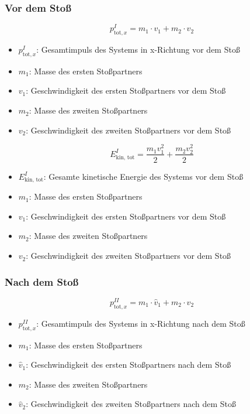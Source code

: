 \documentclass[a4paper, 8pt]{extarticle}
\begin{document}
\begin{landscape}
\begin{multicols*}{3}
\subsubsection{Vor dem Stoß}
\[
p_{\text{tot},x}^I = m_1 \cdot v_1 + m_2 \cdot v_2
\]
{\footnotesize
\begin{itemize}
    \item \( p_{\text{tot},x}^I \): Gesamtimpuls des Systems in x-Richtung vor dem Stoß
    \item \( m_1 \): Masse des ersten Stoßpartners
    \item \( v_1 \): Geschwindigkeit des ersten Stoßpartners vor dem Stoß
    \item \( m_2 \): Masse des zweiten Stoßpartners
    \item \( v_2 \): Geschwindigkeit des zweiten Stoßpartners vor dem Stoß
\end{itemize}
}

\[
E_{\text{kin, tot}}^I = \frac{m_1 v_1^2}{2} + \frac{m_2 v_2^2}{2}
\]
{\footnotesize
\begin{itemize}
    \item \( E_{\text{kin, tot}}^I \): Gesamte kinetische Energie des Systems vor dem Stoß
    \item \( m_1 \): Masse des ersten Stoßpartners
    \item \( v_1 \): Geschwindigkeit des ersten Stoßpartners vor dem Stoß
    \item \( m_2 \): Masse des zweiten Stoßpartners
    \item \( v_2 \): Geschwindigkeit des zweiten Stoßpartners vor dem Stoß
\end{itemize}
}

\subsubsection{Nach dem Stoß}
\[
p_{\text{tot},x}^{II} = m_1 \cdot \hat{v}_1 + m_2 \cdot \hat{v}_2
\]
{\footnotesize
\begin{itemize}
    \item \( p_{\text{tot},x}^{II} \): Gesamtimpuls des Systems in x-Richtung nach dem Stoß
    \item \( m_1 \): Masse des ersten Stoßpartners
    \item \( \hat{v}_1 \): Geschwindigkeit des ersten Stoßpartners nach dem Stoß
    \item \( m_2 \): Masse des zweiten Stoßpartners
    \item \( \hat{v}_2 \): Geschwindigkeit des zweiten Stoßpartners nach dem Stoß
\end{itemize}
}


\end{multicols*}
\end{landscape}
\end{document}
